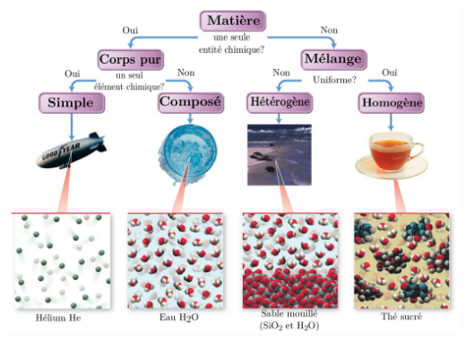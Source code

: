 \documentclass[../../main/main.tex]{subfiles}
\begin{document}
\begin{center}
	\includegraphics[width=.95\linewidth]{compo}
\end{center}
\end{document}
